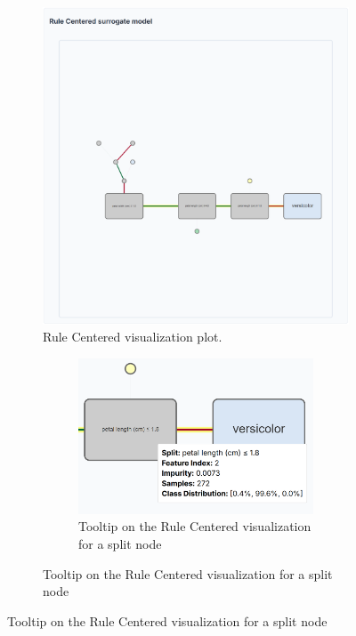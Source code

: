 \begin{figure}[ht!]
    \centering
    \begin{subfigure}[c]{0.68\textwidth}
        \centering
        \includegraphics[width=\linewidth]{images/spawnPlotFinal.png}
        \caption{Rule Centered visualization plot.}
        \label{fig:spawnDecisionTreeFinal}
    \end{subfigure}%
    \hfill
    \begin{subfigure}[c]{0.28\textwidth}
        \centering
        \begin{subfigure}[c]{\linewidth}
            \centering
            \includegraphics[width=\linewidth]{images/spawnDecisionTreeFinalTooltipSplit.png}
            \caption{Tooltip on the Rule Centered visualization for a split node}
            \label{fig:spawnDecisionTreeFinalTooltipSplit}
        \end{subfigure}
        \vspace{0.3cm}
        

\end{subfigure}
\end{figure}
